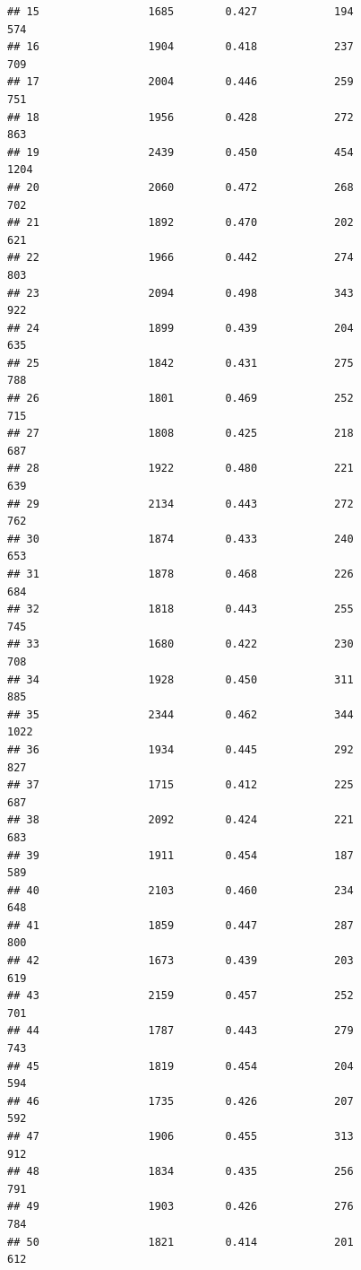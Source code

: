 \documentclass[]{book}
\begin{document}
\begin{verbatim}
## 15                 1685        0.427            194                574
## 16                 1904        0.418            237                709
## 17                 2004        0.446            259                751
## 18                 1956        0.428            272                863
## 19                 2439        0.450            454               1204
## 20                 2060        0.472            268                702
## 21                 1892        0.470            202                621
## 22                 1966        0.442            274                803
## 23                 2094        0.498            343                922
## 24                 1899        0.439            204                635
## 25                 1842        0.431            275                788
## 26                 1801        0.469            252                715
## 27                 1808        0.425            218                687
## 28                 1922        0.480            221                639
## 29                 2134        0.443            272                762
## 30                 1874        0.433            240                653
## 31                 1878        0.468            226                684
## 32                 1818        0.443            255                745
## 33                 1680        0.422            230                708
## 34                 1928        0.450            311                885
## 35                 2344        0.462            344               1022
## 36                 1934        0.445            292                827
## 37                 1715        0.412            225                687
## 38                 2092        0.424            221                683
## 39                 1911        0.454            187                589
## 40                 2103        0.460            234                648
## 41                 1859        0.447            287                800
## 42                 1673        0.439            203                619
## 43                 2159        0.457            252                701
## 44                 1787        0.443            279                743
## 45                 1819        0.454            204                594
## 46                 1735        0.426            207                592
## 47                 1906        0.455            313                912
## 48                 1834        0.435            256                791
## 49                 1903        0.426            276                784
## 50                 1821        0.414            201                612

\end{verbatim}
\end{document}
